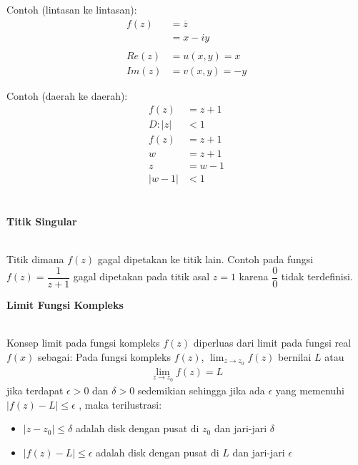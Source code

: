 \documentclass{article}
\begin{document}
    Contoh (lintasan ke lintasan):
    \begin{align}
        f(z)    &= \overline{z}
                \nonumber\\
                &= x - iy
                \\\nonumber\\
        Re(z)   &= u(x,y) = x
                \nonumber\\
        Im(z)   &= v(x,y) = -y
                \nonumber
    \end{align}

    Contoh (daerah ke daerah):
    \begin{align}
        f(z)    &= z + 1
                \nonumber\\
        D : |z| &<1
                \nonumber\\
        f(z)    &= z + 1
                \nonumber\\
        w       &= z + 1
                \nonumber\\
        z       &= w - 1
                \nonumber\\
        |w-1|   &< 1
                \\\nonumber
    \end{align}
    \\

    \begin{center}
        \textbf{Titik Singular}
    \end{center}
    \leavevmode\\

    Titik dimana $f(z)$ gagal dipetakan ke titik lain. Contoh pada fungsi \\ $f(z) = \dfrac{1}{z+1}$ gagal dipetakan pada titik asal $z=1$ karena $\dfrac{0}{0}$ tidak terdefinisi.

    \newpage
    \begin{center}
        \textbf{Limit Fungsi Kompleks}
    \end{center}
    \leavevmode\\

    Konsep limit pada fungsi kompleks $f(z)$ diperluas dari limit pada fungsi real $f(x)$ sebagai:
    Pada fungsi kompleks $f(z)$, $\lim_{z \to z_0} f(z)$ bernilai $L$ atau
    \begin{align}
        \lim_{z \to z_0} f(z) = L
    \end{align}
    jika terdapat $\epsilon  > 0$ dan $\delta  > 0$ sedemikian sehingga jika ada $\epsilon$ yang memenuhi $|f(z) - L| \leq \epsilon$ , maka terilustrasi:
    \begin{itemize}
        \item $|z - z_0| \leq \delta$ adalah disk dengan pusat di $z_0$ dan jari-jari $\delta$
        \item $|f(z) - L| \leq \epsilon$ adalah disk dengan pusat di $L$ dan jari-jari $\epsilon$
    \end{itemize}
    \leavevmode\\ \\
\end{document}
